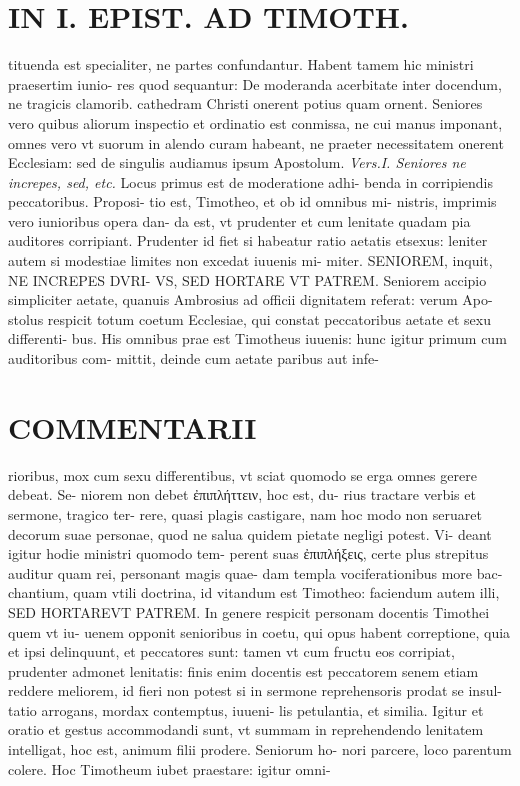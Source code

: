 \documentclass{article}
\begin{document}
\begin{pages}
\section*{IN I. EPIST. AD TIMOTH. }
\marginpar{[ p.117 ]}\pstart tituenda est specialiter, ne partes confundantur. Habent tamem hic ministri praesertim iunio- res quod sequantur: De moderanda acerbitate inter docendum, ne tragicis clamorib. cathedram Christi onerent potius quam ornent. Seniores vero quibus aliorum inspectio et ordinatio est conmissa, ne cui manus imponant, omnes vero vt suorum in alendo curam habeant, ne praeter necessitatem onerent Ecclesiam: sed de singulis audiamus ipsum Apostolum.  \pend
\textit{Vers.I. Seniores ne increpes, sed, etc. }\pstart Locus primus est de moderatione adhi- benda in corripiendis peccatoribus. Proposi- tio est, Timotheo, et ob id omnibus mi- nistris, imprimis vero iunioribus opera dan- da est, vt prudenter et cum lenitate quadam pia auditores corripiant. Prudenter id fiet si habeatur ratio aetatis etsexus: leniter autem si modestiae limites non excedat iuuenis mi- miter.  \pend\pstart SENIOREM, inquit, NE INCREPES DVRI- VS, SED HORTARE VT PATREM. Seniorem accipio simpliciter aetate, quanuis Ambrosius ad officii dignitatem referat: verum Apo- stolus respicit totum coetum Ecclesiae, qui constat peccatoribus aetate et sexu differenti- bus. His omnibus prae est Timotheus iuuenis: hunc igitur primum cum auditoribus com- mittit, deinde cum aetate paribus aut infe-  \pend
\marginpar{[ p.118 ]}
\section*{COMMENTARII }\pstart rioribus, mox cum sexu differentibus, vt sciat quomodo se erga omnes gerere debeat. Se- niorem non debet ἐπιπλήττειν, hoc est, du- rius tractare verbis et sermone, tragico ter- rere, quasi plagis castigare, nam hoc modo non seruaret decorum suae personae, quod ne salua quidem pietate negligi potest. Vi- deant igitur hodie ministri quomodo tem- perent suas ἐπιπλήξεις, certe plus strepitus auditur quam rei, personant magis quae- dam templa vociferationibus more bac- chantium, quam vtili doctrina, id vitandum est Timotheo: faciendum autem illi, SED HORTAREVT PATREM. In genere respicit personam docentis Timothei quem vt iu- uenem opponit senioribus in coetu, qui opus habent correptione, quia et ipsi delinquunt, et peccatores sunt: tamen vt cum fructu eos corripiat, prudenter admonet lenitatis: finis enim docentis est peccatorem senem etiam reddere meliorem, id fieri non potest si in sermone reprehensoris prodat se insul- tatio arrogans, mordax contemptus, iuueni- lis petulantia, et similia. Igitur et oratio et gestus accommodandi sunt, vt summam in reprehendendo lenitatem intelligat, hoc est, animum filii prodere. Seniorum ho- nori parcere, loco parentum colere. Hoc Timotheum iubet praestare: igitur omni-  \pend

\end{pages}
\end{document}
